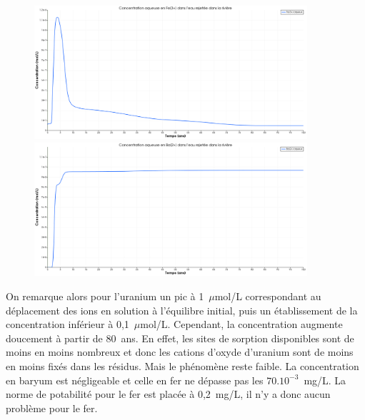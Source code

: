 \documentclass{article}
\begin{document}
\begin{figure}[H]
    \centering
    \begin{minipage}{0.5\textwidth}
        \centering
        \includegraphics[width=0.9\textwidth]{III_B_2_7.png} 
        \caption{}
        \label{fig:Fe_riviere_sable_Base}
    \end{minipage}\hfill
    \begin{minipage}{0.5\textwidth}
        \centering
        \includegraphics[width=0.9\textwidth]{III_B_2_8.png} 
        \caption{}
        \label{fig:Ba_riviere_sable_base}
    \end{minipage}
\end{figure}

On remarque alors pour l’uranium un pic à 1~$\mu$mol/L correspondant au déplacement des ions en solution à l’équilibre initial, puis un établissement de la concentration inférieur à 0,1~$\mu$mol/L. Cependant, la concentration augmente doucement à partir de 80~ans. En effet, les sites de sorption disponibles sont de moins en moins nombreux et donc les cations d’oxyde d’uranium sont de moins en moins fixés dans les résidus. Mais le phénomène reste faible. La concentration en baryum est négligeable et celle en fer ne dépasse pas les $70. 10^{-3}$~mg/L. La norme de potabilité pour le fer est placée à 0,2~mg/L, il n’y a donc aucun problème pour le fer.
\end{document}
